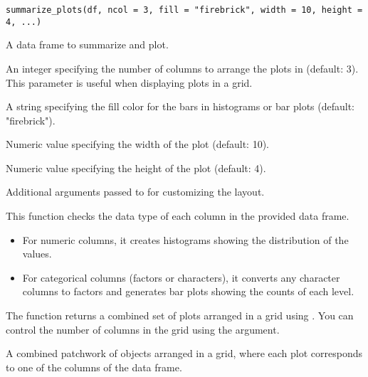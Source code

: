 \documentclass[a4paper]{book}
\begin{document}
%
\begin{Usage}
\begin{verbatim}
summarize_plots(df, ncol = 3, fill = "firebrick", width = 10, height = 4, ...)
\end{verbatim}
\end{Usage}
%
\begin{Arguments}
\begin{ldescription}
\item[\code{df}] A data frame to summarize and plot.

\item[\code{ncol}] An integer specifying the number of columns to arrange the plots in (default: 3).
This parameter is useful when displaying plots in a grid.

\item[\code{fill}] A string specifying the fill color for the bars in histograms or bar plots (default: "firebrick").

\item[\code{width}] Numeric value specifying the width of the plot (default: 10).

\item[\code{height}] Numeric value specifying the height of the plot (default: 4).

\item[\code{...}] Additional arguments passed to  for customizing the layout.
\end{ldescription}
\end{Arguments}
%
\begin{Details}
This function checks the data type of each column in the provided data frame.
\begin{itemize}

\item{} For numeric columns, it creates histograms showing the distribution of the values.
\item{} For categorical columns (factors or characters), it converts any character columns to factors
and generates bar plots showing the counts of each level.

\end{itemize}


The function returns a combined set of plots arranged in a grid using .
You can control the number of columns in the grid using the  argument.
\end{Details}
%
\begin{Value}
A combined patchwork of  objects arranged in a grid, where each plot corresponds
to one of the columns of the data frame.
\end{Value}
\end{document}
